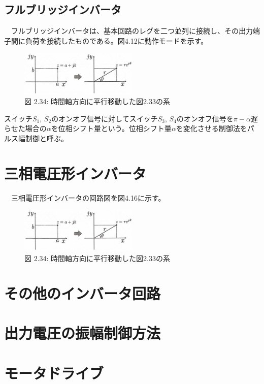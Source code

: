 \documentclass{article}
\begin{document}
\subsection{フルブリッジインバータ}
　フルブリッジインバータは、基本回路のレグを二つ並列に接続し、その出力端子間に負荷を接続したものである。図4.12に動作モードを示す。
\begin{figure}[H]
    \centering
    \includegraphics[width=0.5\textwidth]{images/2_26.jpg}
    \caption{図 2.34: 時間軸方向に平行移動した図2.33の系}
    \label{fig:2.34}
\end{figure}
スイッチ\(S_1\), \(S_2\)のオンオフ信号に対してスイッチ\(S_3\), \(S_4\)のオンオフ信号を\(\pi - \alpha \)遅らせた場合の\(\alpha \)を位相シフト量という。位相シフト量\(\alpha \)を変化させる制御法をパルス幅制御と呼ぶ。

\section{三相電圧形インバータ}
　三相電圧形インバータの回路図を図4.16に示す。
\begin{figure}[H]
    \centering
    \includegraphics[width=0.5\textwidth]{images/2_26.jpg}
    \caption{図 2.34: 時間軸方向に平行移動した図2.33の系}
    \label{fig:2.34}
\end{figure}


\section{その他のインバータ回路}

\section{出力電圧の振幅制御方法}


\setcounter{section}{7}
\renewcommand{\thesection}{4.\arabic{section}}

\section{モータドライブ}
\end{document}
